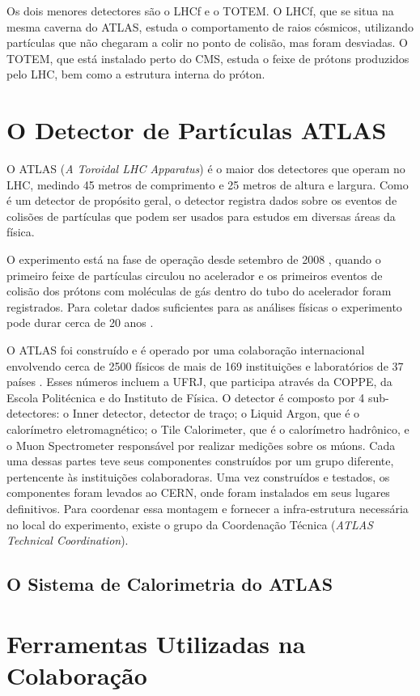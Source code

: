 Os dois menores detectores são o LHCf e o TOTEM. O LHCf, que se situa na mesma
caverna do ATLAS, estuda o comportamento de raios cósmicos, utilizando
partículas que não chegaram a colir no ponto de colisão, mas foram desviadas.
O TOTEM, que está instalado perto do CMS, estuda o feixe de prótons produzidos
pelo LHC, bem como a estrutura interna do próton.

\section{O Detector de Partículas ATLAS}
\label{sec:ATLAS}

O ATLAS (\textit{A Toroidal LHC Apparatus}) é o maior dos detectores que operam
no LHC, medindo 45 metros de comprimento e 25 metros de altura e largura. Como é
um detector de propósito geral, o detector registra dados sobre os eventos de
colisões de partículas que podem ser usados para estudos em diversas áreas da
física. 

O experimento está na fase de operação desde setembro de 2008 \cite{webLHCFirstBeam},
quando o primeiro feixe de partículas circulou no acelerador e os primeiros
eventos de colisão dos prótons com moléculas de gás dentro do tubo do acelerador
foram registrados. Para coletar dados suficientes para as análises físicas o
experimento pode durar cerca de 20 anos \cite{ATLAS_TDR}.

O ATLAS foi construído e é operado por uma colaboração internacional envolvendo
cerca de 2500 físicos de mais de 169 instituições e laboratórios de 37 países
\cite{webATLAS}. Esses números incluem a UFRJ, que participa através da COPPE,
da Escola Politécnica e do Instituto de Física. O detector é composto por 4
sub-detectores: o Inner detector, detector de traço; o Liquid Argon, que é o
calorímetro eletromagnético; o Tile Calorimeter, que é o calorímetro hadrônico,
e o Muon Spectrometer responsável por realizar medições sobre os múons. Cada uma
dessas partes teve seus componentes construídos por um grupo diferente,
pertencente às instituições colaboradoras.  Uma vez construídos e testados, os
componentes foram levados ao CERN, onde foram instalados em seus lugares
definitivos. Para coordenar essa montagem e fornecer a infra-estrutura
necessária no local do experimento, existe o grupo da Coordenação Técnica
({\it ATLAS Technical Coordination}).

\subsection{O Sistema de Calorimetria do ATLAS}
\label{ssec:calorimetria}


\section{Ferramentas Utilizadas na Colaboração}
\label{sec:ferramentas}

